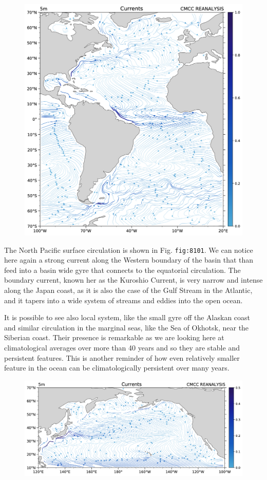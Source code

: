 \begin{figure}
\centering
\includegraphics[width = .7 \textwidth]{figs/GD/UVstream5mGLOBNA.png}
\caption{} \label{fig:}
\end{figure}

The North Pacific surface circulation is shown in Fig.
\texttt{fig:8101}. We can notice here again a strong current along the
Western boundary of the basin that than feed into a basin wide gyre that
connects to the equatorial circulation. The boundary current, known her
as the Kuroshio Current, is very narrow and intense along the Japan
coast, as it is also the case of the Gulf Stream in the Atlantic, and it
tapers into a wide system of streams and eddies into the open ocean.

It is possible to see also local system, like the small gyre off the
Alaskan coast and similar circulation in the marginal seas, like the Sea
of Okhotsk, near the Siberian coast. Their presence is remarkable as we
are looking here at climatological averages over more than 40 years and
so they are stable and persistent features. This is another reminder of
how even relatively smaller feature in the ocean can be climatologically
persistent over many years.

\begin{figure}
\centering
\includegraphics[width = .7 \textwidth]{figs/GD/UVstream5mGLOBNP.png}
\caption{} \label{fig:}
\end{figure}

